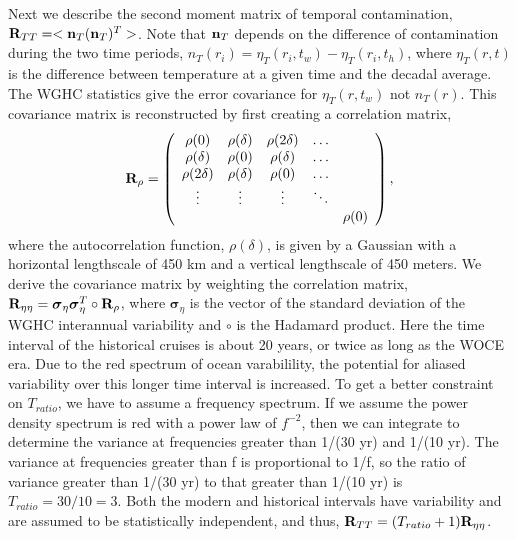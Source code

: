 \documentclass[12pt]{article}
\begin{document}
Next we describe the second moment matrix of temporal contamination,
${\bf R}_{TT} =<{\bf n}_T ({\bf n}_T)^T>$. Note that ${\bf n}_T$
depends on the difference of contamination during the two time
periods, $n_T(r_i) = \eta_T(r_i,t_w) - \eta_T(r_i,t_h)$, where
$\eta_T(r,t)$ is the difference between temperature at a given time
and the decadal average. The WGHC statistics give the error covariance
for $\eta_T(r,t_w)$ not $n_T(r)$. This covariance matrix is
reconstructed by first creating a correlation matrix,
\begin{equation}
  {\bf R}_{\rho} = \left(\begin{array}{ccccc}
\rho(0) & \rho(\delta) & \rho(2\delta) & \hdots & \\
\rho(\delta) & \rho(0) & \rho(\delta) & \hdots &  \\    
\rho(2\delta) & \rho(\delta) & \rho(0) & \hdots &  \\    
\vdots &   \vdots           &  \vdots       &    \ddots & \\
&              &         &     & \rho(0) \end{array} \right),
\end{equation}
where the autocorrelation function, $\rho(\delta)$, is given by a
Gaussian with a horizontal lengthscale of 450 km and a vertical
lengthscale of 450 meters. We derive the covariance matrix by
weighting the correlation matrix,
${\bf R}_{\eta\eta} = {\boldsymbol \sigma}_\eta {\boldsymbol
  \sigma}_\eta^T \circ {\bf R}_{\rho} $, where
${\boldsymbol \sigma}_\eta$ is the vector of the standard deviation of
the WGHC interannual variability and $\circ$ is the Hadamard
product. Here the time interval of the historical cruises is about 20
years, or twice as long as the WOCE era. Due to the red spectrum of
ocean varabilility, the potential for aliased variability over this
longer time interval is increased. To get a better constraint on
$T_{ratio}$, we have to assume a frequency spectrum. If we assume the
power density spectrum is red with a power law of $f^{-2}$, then we
can integrate to determine the variance at frequencies greater than
1/(30 yr) and 1/(10 yr). The variance at frequencies greater than f is
proportional to 1/f, so the ratio of variance greater than 1/(30 yr)
to that greater than 1/(10 yr) is $T_{ratio} = 30/10 = 3$. Both the
modern and historical intervals have variability and are assumed to be
statistically independent, and thus,
${\bf R}_{TT} = (T_{ratio} + 1){\bf R}_{\eta\eta}$.
\end{document}
